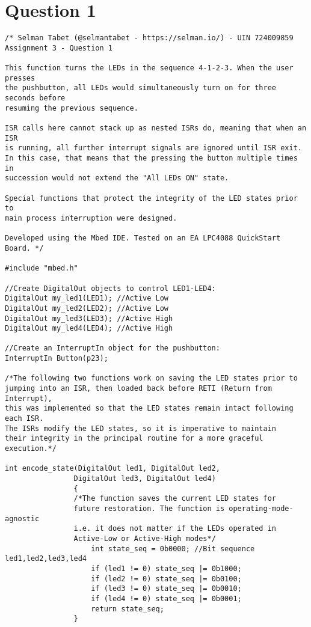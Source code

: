 \documentclass{article}
\begin{document}
\section*{Question 1}
\begin{verbatim}
/* Selman Tabet (@selmantabet - https://selman.io/) - UIN 724009859
Assignment 3 - Question 1

This function turns the LEDs in the sequence 4-1-2-3. When the user presses
the pushbutton, all LEDs would simultaneously turn on for three seconds before
resuming the previous sequence.

ISR calls here cannot stack up as nested ISRs do, meaning that when an ISR
is running, all further interrupt signals are ignored until ISR exit.
In this case, that means that the pressing the button multiple times in
succession would not extend the "All LEDs ON" state.

Special functions that protect the integrity of the LED states prior to
main process interruption were designed.

Developed using the Mbed IDE. Tested on an EA LPC4088 QuickStart Board. */

#include "mbed.h"

//Create DigitalOut objects to control LED1-LED4:
DigitalOut my_led1(LED1); //Active Low
DigitalOut my_led2(LED2); //Active Low
DigitalOut my_led3(LED3); //Active High
DigitalOut my_led4(LED4); //Active High

//Create an InterruptIn object for the pushbutton:
InterruptIn Button(p23);

/*The following two functions work on saving the LED states prior to 
jumping into an ISR, then loaded back before RETI (Return from Interrupt),
this was implemented so that the LED states remain intact following each ISR.
The ISRs modify the LED states, so it is imperative to maintain
their integrity in the principal routine for a more graceful execution.*/

int encode_state(DigitalOut led1, DigitalOut led2, 
                DigitalOut led3, DigitalOut led4)
                {
                /*The function saves the current LED states for 
                future restoration. The function is operating-mode-agnostic
                i.e. it does not matter if the LEDs operated in
                Active-Low or Active-High modes*/
                    int state_seq = 0b0000; //Bit sequence led1,led2,led3,led4
                    if (led1 != 0) state_seq |= 0b1000;
                    if (led2 != 0) state_seq |= 0b0100;
                    if (led3 != 0) state_seq |= 0b0010;
                    if (led4 != 0) state_seq |= 0b0001;
                    return state_seq;
                }
                

\end{verbatim}
\end{document}
